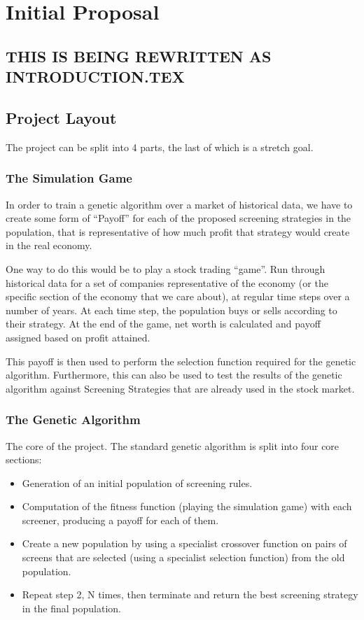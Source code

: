 \section{Initial Proposal}
\subsection{THIS IS BEING REWRITTEN AS INTRODUCTION.TEX}
\subsection{Project Layout}
The project can be split into 4 parts, the last of which is a stretch goal.

\subsubsection{The Simulation Game}
In order to train a genetic algorithm over a market of historical data, we have to create some form of “Payoff” for each of the proposed screening strategies in the population, that is representative of how much profit that strategy would create in the real economy. \newline

One way to do this would be to play a stock trading “game”. Run through historical data for a set of companies representative of the economy (or the specific section of the economy that we care about), at regular time steps over a number of years. At each time step, the population buys or sells according to their strategy. At the end of the game, net worth is calculated and payoff assigned based on profit attained. \newline

This payoff is then used to perform the selection function required for the genetic algorithm. Furthermore, this can also be used to test the results of the genetic algorithm against Screening Strategies that are already used in the stock market.

\subsubsection{The Genetic Algorithm}
The core of the project. The standard genetic algorithm is split into four core sections:
\begin{itemize}
\item Generation of an initial population of screening rules.
\item Computation of the fitness function (playing the simulation game) with each screener, producing a payoff for each of them.
\item Create a new population by using a specialist crossover function on pairs of screens that are selected (using a specialist selection function) from the old population.
\item Repeat step 2, N times, then terminate and return the best screening strategy in the final population.
\end{itemize}

